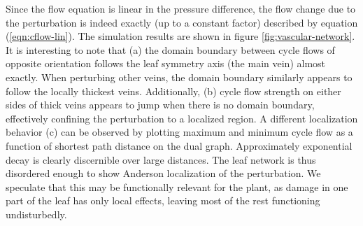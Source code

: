 \documentclass[10pt,aps,pra,twocolumn,superscriptaddress]{revtex4-1}
\begin{document}
Since the flow equation is linear in the pressure difference, the
flow change due to the perturbation is indeed exactly 
(up to a constant factor) described by equation (\ref{eqn:cflow-lin}).
The simulation results are shown in figure \ref{fig:vascular-network}.
It is interesting to note that (a) the domain boundary between cycle
flows of opposite orientation follows the leaf symmetry axis (the main
vein) almost exactly. When perturbing other veins, the domain boundary
similarly appears to follow the locally thickest veins.
Additionally, (b) cycle flow strength on either sides of thick veins
appears to jump when there is no domain boundary, effectively confining
the perturbation to a localized region.
A different localization behavior (c) can be observed by plotting
maximum and minimum cycle flow as a function of shortest path distance
on the dual graph. Approximately exponential decay is clearly discernible
over large distances. The leaf network is thus disordered enough
to show Anderson localization of the perturbation.
We speculate that this may be functionally relevant for the plant,
as damage in one part of the leaf has only local effects, leaving
most of the rest functioning undisturbedly.
\end{document}
